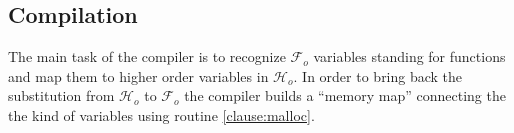 \documentclass[sigconf,natbib=false,review]{acmart}
\newcommand{\llambda}{\ensuremath{\mathcal{L}_\lambda}\xspace}
\newcommand{\Fo}{\ensuremath{\mathcal{F}_{\!o}\xspace}} %
\newcommand{\Ho}{\ensuremath{\mathcal{H}_o}\xspace}
\begin{document}







\subsection{Compilation}
\label{sec:compilation}

The main task of the compiler is to recognize \Fo{} variables standing
for functions and map them to higher order variables in \Ho.
In order to bring back the substitution from \Ho{} to \Fo{} the compiler
builds a ``memory map'' connecting the the kind of variables using routine
\ref{clause:malloc}.
\end{document}
